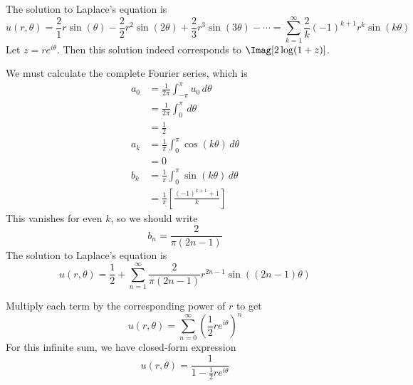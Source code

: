 \documentclass[a4paper]{article}
\begin{document}
The solution to Laplace's equation is
\[
	u\!\left( r, \theta \right) = \frac{2}{1}r \sin\!\left(\theta\right) - \frac{2}{2}r^{2}\sin\!\left(2 \theta\right) + \frac{2}{3}r^{3}\sin\!\left(3 \theta\right) - \cdots = \sum_{k = 1}^{\infty} \frac{2}{k}\!\left( -1 \right)^{k + 1}r^{k} \sin\!\left(k \theta\right)  
\]
Let \( z = re^{i \theta} \). Then this solution indeed corresponds to \( \Imag \!\left[ 2 \log \!\left( 1 + z \right) \right] \).

\vspace{12pt}


We must calculate the complete Fourier series, which is
\begin{align*}
	a_{0} & = \frac{1}{2 \pi} \int^{\pi}_{-\pi} u_{0} \, d \theta \\
	 & = \frac{1}{2 \pi} \int^{\pi}_{0} \, d \theta \\ 
	 & = \frac{1}{2} \\
	a_{k} & = \frac{1}{\pi} \int^{\pi}_{0} \cos\!\left(k \theta\right) \, d \theta \\
	      & = 0 \\
	b_{k} & = \frac{1}{\pi} \int^{\pi}_{0} \sin\!\left(k \theta\right) \, d \theta \\
	      & = \frac{1}{\pi} \!\left[ \frac{\!\left( -1 \right)^{k + 1} + 1}{k} \right]
\end{align*}
This vanishes for even \( k \), so we should write
\[
	b_{n} = \frac{2}{\pi \!\left( 2n - 1 \right)} 
\]
The solution to Laplace's equation is
\[
	u \!\left( r, \theta \right) = \frac{1}{2} + \sum_{n = 1}^{\infty} \frac{2}{\pi \!\left( 2n - 1 \right)} r^{2n - 1} \sin\!\left(\!\left( 2n - 1 \right) \theta \right)
\]


Multiply each term by the corresponding power of \( r \) to get
\[
	u \!\left( r, \theta \right) = \sum_{n = 0}^{\infty} \!\left( \frac{1}{2}re^{i \theta} \right)^{n}
\]
For this infinite sum, we have closed-form expression
\[
	u \!\left( r, \theta \right) = \frac{1}{1 - \frac{1}{2}re^{i \theta}}
\]
\end{document}

